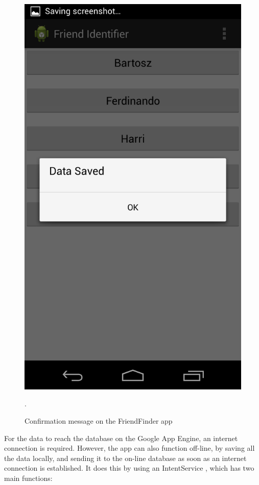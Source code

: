 \begin{figure}[h]
	\begin{center}
		\includegraphics[scale=0.2]{figures/ff_conf.png}
	\end{center}
	
	\caption{Confirmation message on the FriendFinder app}.
	\label{pic:ff_conf}

\end{figure}

For the data to reach the database on the Google App Engine, an internet connection is required. However, the app can also function off-line, by saving all the data locally, and sending it to the on-line database as soon as an internet connection is established. It does this by using an IntentService \cite{intentservice}, which has two main functions:

